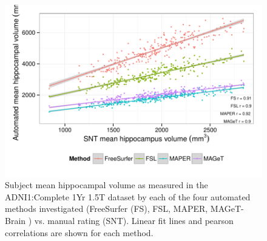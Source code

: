 \documentclass{article}\usepackage{graphicx, color}
\makeatletter
\def\maxwidth{ %
  \ifdim\Gin@nat@width>\linewidth
    \linewidth
  \else
    \Gin@nat@width
  \fi
}
\newenvironment{knitrout}{}{} %
\newcommand{\mb}{MAGeT-Brain }
\newcommand{\adnidataset}{ADNI1:Complete 1Yr 1.5T }
\makeatother
\begin{document}
\begin{figure}[h]
\begin{knitrout}
\color{fgcolor}

{\centering \includegraphics[width=\maxwidth]{figure/ADNI-volumes-plot} 

}



\end{knitrout}

  \caption{Subject mean hippocampal volume as measured in the \adnidataset
dataset by each of the four automated methods investigated (FreeSurfer (FS),
FSL, MAPER, \mb) vs. manual rating (SNT). Linear fit lines and pearson
correlations are shown for each method.}
  \label{fig:ADNI-volumes-plot}
\end{figure}
 
\end{document}
